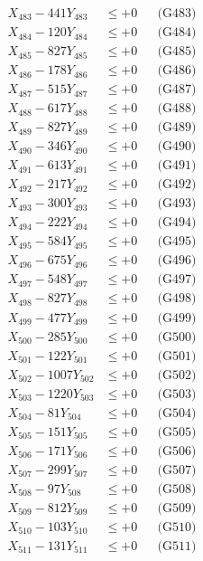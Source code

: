 \documentclass[a4paper,10pt]{article}
\begin{document}
{\begin{align}
X_{483} - 441Y_{483} &\leq +0 && \text{(G483)} \\
X_{484} - 120Y_{484} &\leq +0 && \text{(G484)} \\
X_{485} - 827Y_{485} &\leq +0 && \text{(G485)} \\
X_{486} - 178Y_{486} &\leq +0 && \text{(G486)} \\
X_{487} - 515Y_{487} &\leq +0 && \text{(G487)} \\
X_{488} - 617Y_{488} &\leq +0 && \text{(G488)} \\
X_{489} - 827Y_{489} &\leq +0 && \text{(G489)} \\
X_{490} - 346Y_{490} &\leq +0 && \text{(G490)} \\
\allowbreak
X_{491} - 613Y_{491} &\leq +0 && \text{(G491)} \\
X_{492} - 217Y_{492} &\leq +0 && \text{(G492)} \\
X_{493} - 300Y_{493} &\leq +0 && \text{(G493)} \\
X_{494} - 222Y_{494} &\leq +0 && \text{(G494)} \\
X_{495} - 584Y_{495} &\leq +0 && \text{(G495)} \\
X_{496} - 675Y_{496} &\leq +0 && \text{(G496)} \\
X_{497} - 548Y_{497} &\leq +0 && \text{(G497)} \\
X_{498} - 827Y_{498} &\leq +0 && \text{(G498)} \\
X_{499} - 477Y_{499} &\leq +0 && \text{(G499)} \\
X_{500} - 285Y_{500} &\leq +0 && \text{(G500)} \\
\allowbreak
X_{501} - 122Y_{501} &\leq +0 && \text{(G501)} \\
X_{502} - 1007Y_{502} &\leq +0 && \text{(G502)} \\
X_{503} - 1220Y_{503} &\leq +0 && \text{(G503)} \\
X_{504} - 81Y_{504} &\leq +0 && \text{(G504)} \\
X_{505} - 151Y_{505} &\leq +0 && \text{(G505)} \\
X_{506} - 171Y_{506} &\leq +0 && \text{(G506)} \\
X_{507} - 299Y_{507} &\leq +0 && \text{(G507)} \\
X_{508} - 97Y_{508} &\leq +0 && \text{(G508)} \\
X_{509} - 812Y_{509} &\leq +0 && \text{(G509)} \\
X_{510} - 103Y_{510} &\leq +0 && \text{(G510)} \\
\allowbreak
X_{511} - 131Y_{511} &\leq +0 && \text{(G511)} \\

\end{align}}
\end{document}
